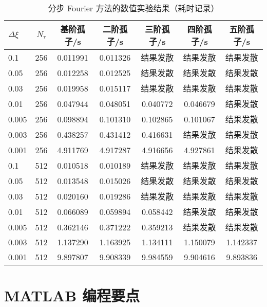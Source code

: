 \begin{table}[tbp]
  \centering
  \caption*{分步 Fourier 方法的数值实验结果（耗时记录）}
  \begin{tabular}{lcccccc}
    \toprule 
      $\Delta \xi$ & $N_\tau$ & 基阶孤子/s & 二阶孤子/s & 三阶孤子/s & 四阶孤子/s & 五阶孤子/s \\
    \midrule
      0.1 & 256 & 0.011991 & 0.011326 & 结果发散 & 结果发散 & 结果发散 \\
      0.05 & 256 & 0.012258 & 0.012525 & 结果发散 & 结果发散 & 结果发散 \\
      0.03 & 256 & 0.019958 & 0.015117 & 结果发散 & 结果发散 & 结果发散 \\
      0.01 & 256 & 0.047944 & 0.048051 & 0.040772 & 0.046679 & 结果发散 \\
      0.005 & 256 & 0.098894 & 0.101310 & 0.102865 & 0.101067 & 结果发散 \\
      0.003 & 256 & 0.438257 & 0.431412 & 0.416631 & 结果发散 & 结果发散 \\
      0.001 & 256 & 4.911769 & 4.917287 & 4.916656 & 4.927861 & 结果发散 \\
      0.1 & 512 & 0.010518 & 0.010189 & 结果发散 & 结果发散 & 结果发散 \\
      0.05 & 512 & 0.013548 & 0.015026 & 结果发散 & 结果发散 & 结果发散 \\
      0.03 & 512 & 0.020160 & 0.019286 & 结果发散 & 结果发散 & 结果发散 \\
      0.01 & 512 & 0.066089 & 0.059894 & 0.058442 & 结果发散 & 结果发散 \\
      0.005 & 512 & 0.362146 & 0.371222 & 0.359213 & 结果发散 & 结果发散 \\
      0.003 & 512 & 1.137290 & 1.163925 & 1.134111 & 1.150079 & 1.142337 \\
      0.001 & 512 & 9.897807 & 9.908339 & 9.984559 & 9.904616 & 9.893836 \\
    \bottomrule
    \end{tabular}
\end{table}

\newpage
\section*{MATLAB 编程要点}
